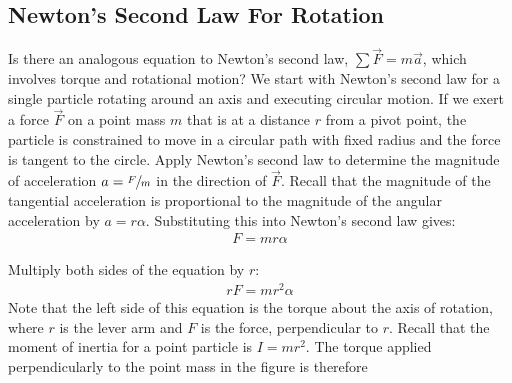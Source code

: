 \documentclass[a4paper]{article}
\def\centerarc[#1](#2)(#3:#4:#5){\draw[#1] ($(#2)+({#5*cos(#3)},{#5*sin(#3)})$) arc (#3:#4:#5)}
\begin{document}
\subsection{Newton's Second Law For Rotation}
Is there an analogous equation to Newton's second law, $\sum\vec{F} = m\vec{a}$, which involves torque and rotational motion? We start with Newton's second law for a single particle rotating around an axis and executing circular motion. If we exert a force $\vec{F}$ on a point mass $m$ that is at a distance $r$ from a pivot point, the particle is constrained to move in a circular path with fixed radius and the force is tangent to the circle. Apply Newton's second law to determine the magnitude of acceleration $a = \sfrac{F}{m}$ in the direction of $\vec{F}$. Recall that the magnitude of the tangential acceleration is proportional to the magnitude of the angular acceleration by $a = r\alpha$. Substituting this into Newton's second law gives:
\begin{align*}
    F = mr\alpha
\end{align*}
\begin{center}
\end{center}
Multiply both sides of the equation by $r$:
\begin{align*}
    rF = mr^2\alpha
\end{align*}
Note that the left side of this equation is the torque about the axis of rotation, where $r$ is the lever arm and $F$ is the force, perpendicular to $r$. Recall that the moment of inertia for a point particle is $I = mr^2$. The torque applied perpendicularly to the point mass in the figure is therefore
\end{document}

